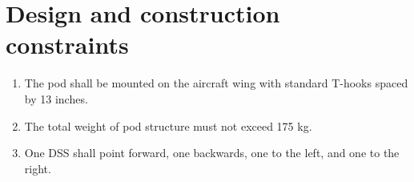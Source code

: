 \documentclass[Main]{subfiles}
\begin{document}
\section{Design and construction constraints}

\begin{enumerate}[{SR}-4.1]
\item The pod shall be mounted on the aircraft wing with standard T-hooks spaced by 13 inches.

\item The total weight of pod structure must not exceed 175 kg.

\item One DSS shall point forward, one backwards, one to the left, and one to the right.

\end{enumerate}
\end{document}
